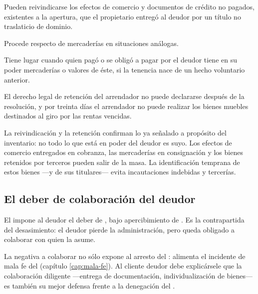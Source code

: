 \begin{description}[leftmargin=0pt,style=nextline,font=\sffamily\bfseries]
  \item[Reivindicación de efectos de comercio (\art{151})] Pueden reivindicarse los efectos de
  comercio y documentos de crédito no pagados, existentes a la apertura, que el propietario
  entregó al deudor por un título no traslaticio de dominio.
  \item[Reivindicación de mercaderías (\art{152})] Procede respecto de mercaderías en
  situaciones análogas.
  \item[Derecho legal de retención (\art{160})] Tiene lugar cuando quien pagó o se obligó a
  pagar por el deudor tiene en su poder mercaderías o valores de éste, si la tenencia nace de un
  hecho voluntario anterior.
  \item[Arrendamiento (\art{141})] El derecho legal de retención del arrendador no puede
  declararse después de la resolución, y por treinta días el arrendador no puede realizar los
  bienes muebles destinados al giro por las rentas vencidas.
\end{description}

\begin{alerta}
La reivindicación y la retención confirman lo ya señalado a propósito del inventario: no todo lo
que está en poder del deudor es suyo. Los efectos de comercio entregados en cobranza, las
mercaderías en consignación y los bienes retenidos por terceros pueden salir de la masa. La
identificación temprana de estos bienes ---y de sus titulares--- evita incautaciones indebidas y
tercerías.
\end{alerta}

\subsection{El deber de colaboración del deudor}

El  impone al deudor el deber de , bajo apercibimiento de . Es la contrapartida del desasimiento: el deudor pierde la administración,
pero queda obligado a colaborar con quien la asume.

\begin{practica}
La negativa a colaborar no sólo expone al arresto del : alimenta el incidente de mala
fe del  (capítulo \ref{cap:mala-fe}). Al cliente deudor debe explicársele que la
colaboración diligente ---entrega de documentación, individualización de bienes--- es también su
mejor defensa frente a la denegación del \discharge{}.
\end{practica}


